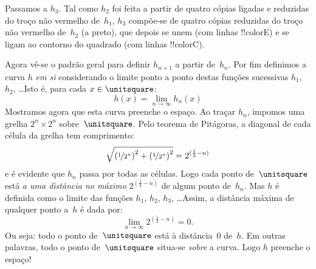 \documentclass[../../../include/open-logic-section]{subfiles}
\begin{document}
Passamos a $h_3$. Tal como $h_2$ foi feita a partir de quatro cópias ligadas e reduzidas do troço não vermelho de~$h_1$, $h_3$ compõe-se de quatro cópias reduzidas do troço não vermelho de~$h_2$ (a preto), que depois se unem (com linhas !!{colorE}) e se ligam ao contorno do quadrado (com linhas !!{colorC}).
\begin{center}
\end{center}
Agora vê-se o padrão geral para definir $h_{n+1}$ a partir de~$h_n$.
Por fim definimos a curva $h$ \emph{em si} considerando o
limite ponto a ponto destas funções sucessivas $h_1$, $h_2$,
\dots\@ Isto é, para cada $x \in \unitsquare$:
\[
	h(x) = \lim_{n \rightarrow \infty} h_n(x)
\]
Mostramos agora que esta curva preenche o espaço. Ao traçar $h_n$,
impomos uma grelha $2^n \times 2^n$ sobre~$\unitsquare$. Pelo teorema de Pitágoras, a diagonal de cada célula da grelha tem comprimento:
\[
\sqrt{\left(\nicefrac{1}{2^{n}}\right)^2+\left(\nicefrac{1}{2^{n}}\right)^2} = 2^{(\frac{1}{2}-n)}
\]
e é evidente que $h_n$ passa por todas as células. Logo cada ponto
de~$\unitsquare$ está \emph{a uma distância no máximo} $2^{(\frac{1}{2}-n)}$ de algum ponto de~$h_n$. Mas $h$ é definida como o limite das
funções $h_1$, $h_2$, $h_3$, \dots\@ Assim, a distância máxima de qualquer
ponto a~$h$ é dada por:
\[
\lim_{n \rightarrow \infty} 2^{(\frac{1}{2}-n)} = 0.
\]
Ou seja: todo o ponto de~$\unitsquare$ está à distância~$0$ de~$h$. Em
outras palavras, todo o ponto de~$\unitsquare$ situa-se \emph{sobre} a curva. Logo $h$
preenche o espaço!{}
\end{document}
